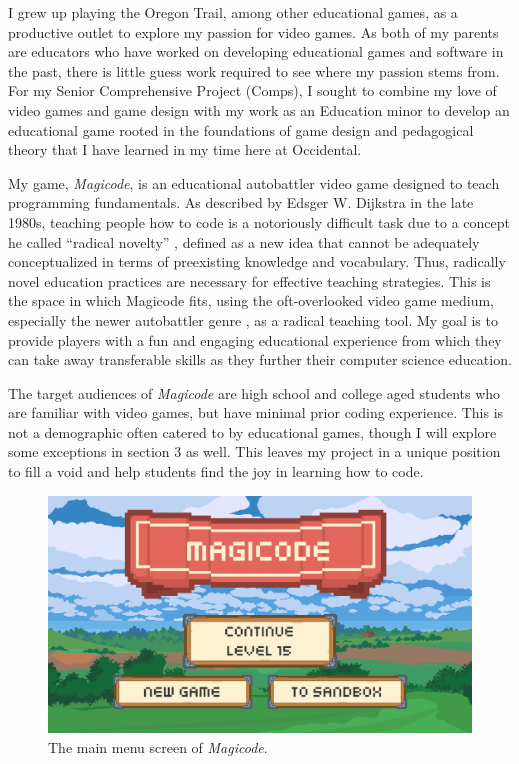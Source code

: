 \documentclass[10pt,twocolumn]{article}
\begin{document}
I grew up playing the Oregon Trail, among other educational games, as a productive outlet to explore my passion for video games. As both of my parents are educators who have worked on developing educational games and software in the past, there is little guess work required to see where my passion stems from. For my Senior Comprehensive Project (Comps), I sought to combine my love of video games and game design with my work as an Education minor to develop an educational game rooted in the foundations of game design and pedagogical theory that I have learned in my time here at Occidental.

My game, \textit{Magicode}, is an educational autobattler video game designed to teach programming fundamentals. As described by Edsger W. Dijkstra in the late 1980s, teaching people how to code is a notoriously difficult task due to a concept he called “radical novelty” \cite{dijkstra-difficulty}, defined as a new idea that cannot be adequately conceptualized in terms of preexisting knowledge and vocabulary. Thus, radically novel education practices are necessary for effective teaching strategies. This is the space in which Magicode fits, using the oft-overlooked video game medium, especially the newer autobattler genre \cite{autobattler-genre}, as a radical teaching tool. My goal is to provide players with a fun and engaging educational experience from which they can take away transferable skills as they further their computer science education.

The target audiences of \textit{Magicode} are high school and college aged students who are familiar with video games, but have minimal prior coding experience. This is not a demographic often catered to by educational games, though I will explore some exceptions in section 3 as well. This leaves my project in a unique position to fill a void and help students find the joy in learning how to code.

\begin{figure}
    \centering
    \includegraphics[width=\linewidth]{images/screenshots/main_menu.png}
    \caption{The main menu screen of \textit{Magicode}.}
    \label{fig:main-menu}
\end{figure}
\end{document}
